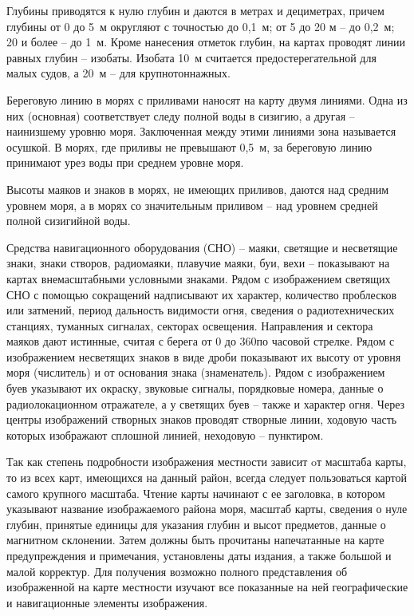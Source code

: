 Глубины приводятся к нулю глубин и даются в метрах и дециметрах, причем глубины от 0 до 5~м округляют с точностью до 0,1~м; от 5 до 20 м \--- до 0,2~м; 20 и более \--- до 1~м. Кроме нанесения отметок глубин, на картах проводят линии равных глубин \--- изобаты. Изобата 10~м считается предостерегательной для малых судов, а 20~м \--- для крупнотоннажных. 

Береговую линию в морях с приливами наносят на карту двумя линиями. Одна из них (основная) соответствует следу полной воды в сизигию, а другая \--- наинизшему уровню моря. Заключенная между этими линиями зона называется осушкой. В морях, где приливы не превышают 0,5~м, за береговую линию принимают урез воды при среднем уровне моря. 

Высоты маяков и знаков в морях, не имеющих приливов, даются над средним уровнем моря, а в морях со значительным приливом \--- над уровнем средней полной сизигийной воды. 

Средства навигационного оборудования (СНО) \--- маяки, светящие и несветящие знаки, знаки створов, радиомаяки, плавучие маяки, буи, вехи \--- показывают на картах внемасштабными условными знаками. Рядом с изображением светящих СНО с помощью сокращений надписывают их характер, количество проблесков или затмений, период дальность видимости огня, сведения о радиотехнических станциях, туманных сигналах, секторах освещения. Направления и сектора маяков дают истинные, считая с берега от 0 до 360\gr по часовой стрелке. Рядом с изображением несветящих знаков в виде дроби показывают их высоту от уровня моря (числитель) и от основания знака (знаменатель). Рядом с изображением буев указывают их окраску, звуковые сигналы, порядковые номера, данные о радиолокационном отражателе, а у светящих буев \--- также и характер огня. Через центры изображений створных знаков проводят створные линии, ходовую часть которых изображают сплошной линией, неходовую \--- пунктиром. 

Так как степень подробности изображения местности зависит oт масштаба карты, то из всех карт, имеющихся на данный район, всегда следует пользоваться картой самого крупного масштаба. Чтение карты начинают с ее заголовка, в котором указывают название изображаемого района моря, масштаб карты, сведения о нуле глубин, принятые единицы для указания глубин и высот предметов, данные о магнитном склонении. Затем должны быть прочитаны напечатанные на карте предупреждения и примечания, установлены даты издания, а также большой и малой корректур. Для получения возможно полного представления об изображенной на карте местности изучают все показанные на ней географические и навигационные элементы изображения. 

